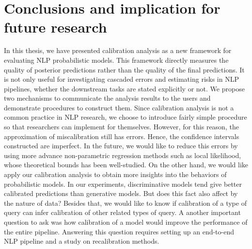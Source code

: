 \chapter{Conclusions and implication for future research}

In this thesis, we have presented calibration analysis as a new framework for evaluating NLP probabilistic models. This framework directly measures the quality of posterior predictions rather than the quality of the final predictions. It is not only useful for investigating cascaded errors and estimating risks in NLP pipelines, whether the downstream tasks are stated explicitly or not. We propose two mechanisms to communicate the analysis results to the users and demonstrate procedures to construct them. Since calibration analysis is not a common practice in NLP research, we choose to introduce fairly simple procedure so that researchers can implement for themselves. However, for this reason, the approximation of miscalibration still has errors. Hence, the confidence intervals constructed are imperfect. In the future, we would like to reduce this errors by using more advance non-parametric regression methods such as local likelihood, whose theoretical bounds has been well-studied. On the other hand, we would like apply our calibration analysis to obtain more insights into the behaviors of probabilistic models. In our experiments, discriminative models tend give better calibrated predictions than generative models. But does this fact also affect by the nature of data? Besides that, we would like to know if calibration of a type of query can infer calibration of other related types of query. A another important question to ask was how calibration of a model would improve the performance of the entire pipeline. Answering this question requires setting up an end-to-end NLP pipeline and a study on recalibration methods.     
